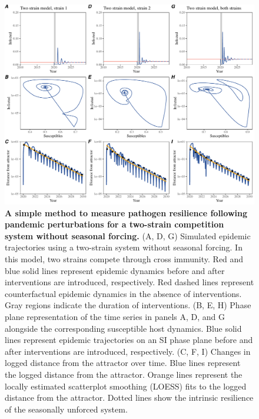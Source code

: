 \documentclass[12pt]{article}
\begin{document}
\pagebreak

\begin{figure}[!th]
\includegraphics[width=\textwidth]{../figure2/figure2_multi_noseas.pdf}
\caption{
\textbf{A simple method to measure pathogen resilience following pandemic perturbations for a two-strain competition system without seasonal forcing.}
(A, D, G) Simulated epidemic trajectories using a two-strain system without seasonal forcing.
In this model, two strains compete through cross immunity.
Red and blue solid lines represent epidemic dynamics before and after interventions are introduced, respectively.
Red dashed lines represent counterfactual epidemic dynamics in the absence of interventions.
Gray regions indicate the duration of interventions.
(B, E, H) Phase plane representation of the time series in panels A, D, and G alongside the corresponding susceptible host dynamics.
Blue solid lines represent epidemic trajectories on an SI phase plane before and after interventions are introduced, respectively.
(C, F, I) Changes in logged distance from the attractor over time.
Blue lines represent the logged distance from the attractor.
Orange lines represent the locally estimated scatterplot smoothing (LOESS) fits to the logged distance from the attractor.
Dotted lines show the intrinsic resilience of the seasonally unforced system.
}
\end{figure}

\pagebreak
\end{document}
